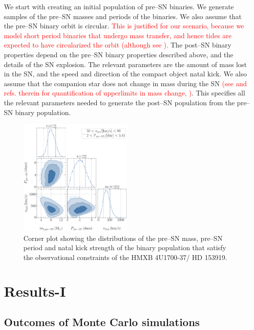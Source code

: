 \documentclass[linenumbers,trackchanges,twocolumn]{aastex701}
\newcommand{\red}{\textcolor{red}}
\begin{document}
We start with creating an initial population of pre--SN binaries. We generate samples of the pre--SN masses and periods of the binaries. We also assume that the pre--SN binary orbit is circular. \red{This is justified for our scenario, because we model short period binaries that undergo mass transfer, and hence tides are expected to have circularized the orbit (although see \cite{2009MNRAS.400L..20E, 2025ApJ...983...39R,2025arXiv250905243P}).} The post--SN binary properties depend on the pre--SN binary properties described above, and the details of the SN explosion. The relevant parameters are the amount of mass lost in the SN, and the speed and direction of the compact object natal kick. We also assume that the companion star does not change in mass during the SN \red{(see \cite{1998A&A...330.1047T} and refs. therein for quantification of upperlimits in mass change, \cite{2018PhDT.......211H,2021MNRAS.505.2485O})}. This specifies all the relevant parameters needed to generate the post--SN population from the pre--SN binary population. 

\begin{figure}[htbp]
    \centering
    \includegraphics[width=0.5\textwidth]{xrb-monte-carlo-mass-period-kick.pdf}
    \caption{Corner plot showing the distributions of the pre--SN mass, pre--SN period and natal kick strength of the binary population that satisfy the observational constraints of the HMXB 4U1700-37/ HD 153919.}
    \label{fig:xrb_monte_carlo}
\end{figure}

\section{Results-I}

\subsection{Outcomes of Monte Carlo simulations} \label{sec:monte_carlo}
\end{document}
